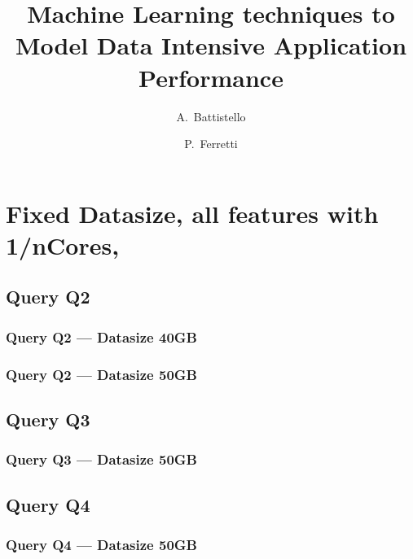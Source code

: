\documentclass[a4paper,11pt]{article}
\author{A.~Battistello\and P.~Ferretti}
\title{Machine Learning techniques to Model Data Intensive Application Performance}
\date{}
\begin{document}
\maketitle
\tableofcontents




\newpage
\section{Fixed Datasize, all features with 1/nCores,}
\subsection{Query Q2}
\subsubsection{Query Q2 --- Datasize 40GB}



\newpage
\subsubsection{Query Q2 --- Datasize 50GB}



\newpage


\subsection{Query Q3}
\subsubsection{Query Q3 --- Datasize 50GB}



\newpage

\subsection{Query Q4}
\subsubsection{Query Q4 --- Datasize 50GB}



\newpage
\end{document}
